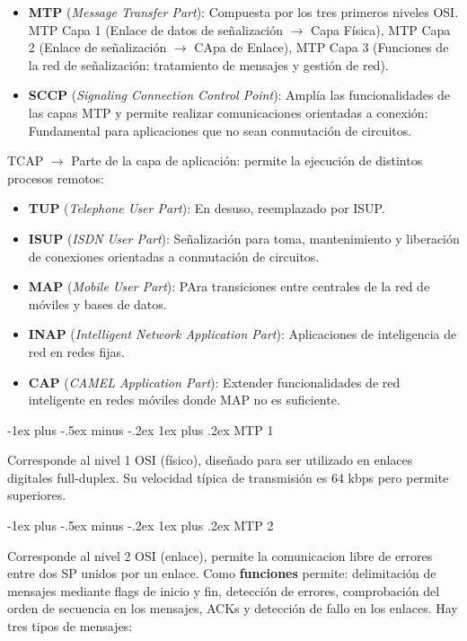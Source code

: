 \documentclass[10pt,portrait, twocolumn]{article}
\makeatletter
\renewcommand{\subsubsection}{\@startsection{subsubsection}{3}{0mm}%
                                {-1ex plus -.5ex minus -.2ex}%
                                {1ex plus .2ex}%
                                {\normalfont\small\bfseries}}
\makeatother
\begin{document}
	\begin{itemize}
		\item \textbf{MTP} (\textit{Message Transfer Part}): Compuesta por los tres primeros niveles OSI. MTP Capa 1 (Enlace de datos de señalización $\rightarrow$ Capa Física), MTP Capa 2 (Enlace de señalización $\rightarrow$ CApa de Enlace), MTP Capa 3 (Funciones de la red de señalización: tratamiento de mensajes y gestión de red).
		\item \textbf{SCCP} (\textit{Signaling Connection Control Point}): Amplía las funcionalidades de las capas MTP y permite realizar comunicaciones orientadas a conexión: Fundamental para aplicaciones que no sean conmutación de circuitos.
	\end{itemize}

TCAP $\rightarrow$ Parte de la capa de aplicación: permite la ejecución de distintos procesos remotos:

	\begin{itemize}
		\item \textbf{TUP} (\textit{Telephone User Part}): En desuso, reemplazado por ISUP.
		\item \textbf{ISUP} (\textit{ISDN User Part}): Señalización para toma, mantenimiento y liberación de conexiones orientadas a conmutación de circuitos.
		\item \textbf{MAP} (\textit{Mobile User Part}): PAra transiciones entre centrales de la red de móviles y bases de datos.
		\item \textbf{INAP} (\textit{Intelligent Network Application Part}): Aplicaciones de inteligencia de red en redes fijas.
		\item \textbf{CAP} (\textit{CAMEL Application Part}): Extender funcionalidades de red inteligente en redes móviles donde MAP no es suficiente.
	\end{itemize}

\subsubsection{MTP 1}

Corresponde al nivel 1 OSI (físico), diseñado para ser utilizado en enlaces digitales full-duplex. Su velocidad típica de transmisión es 64 kbps pero permite superiores.

\subsubsection{MTP 2}

Corresponde al nivel 2 OSI (enlace), permite la comunicacion libre de errores entre dos SP unidos por un enlace. Como \textbf{funciones} permite: delimitación de mensajes mediante flags de inicio y fin, detección de errores, comprobación del orden de secuencia en los mensajes, ACKs y detección de fallo en los enlaces. Hay tres tipos de mensajes:
\end{document}

